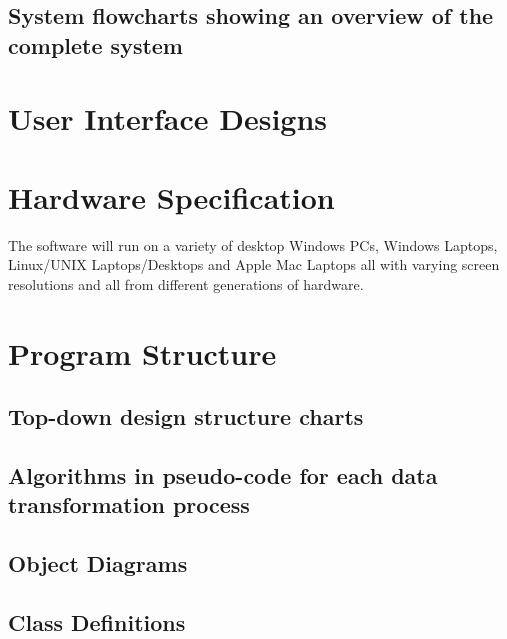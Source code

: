 \subsection{System flowcharts showing an overview of the complete system}

\section{User Interface Designs}
	

\section{Hardware Specification}
	The software will run on a variety of desktop Windows PCs, Windows Laptops, Linux/UNIX Laptops/Desktops and Apple Mac Laptops all with varying screen resolutions and all from different generations of hardware.


\section{Program Structure}

\subsection{Top-down design structure charts}


\subsection{Algorithms in pseudo-code for each data transformation process}


\subsection{Object Diagrams}

    \begin{figure}[H]
    \end{figure}

\subsection{Class Definitions}

